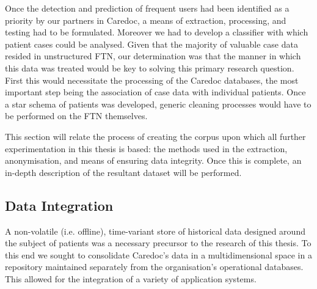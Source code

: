 %

Once the detection and prediction of frequent users had been identified as a priority by our partners in Caredoc, a means of extraction, processing, and testing had to be formulated. Moreover we had to develop a classifier with which patient cases could be analysed. Given that the majority of valuable case data resided in unstructured FTN, our determination was that the manner in which this data was treated would be key to solving this primary research question. First this would necessitate the processing of the Caredoc databases, the most important step being the association of case data with individual patients. Once a star schema of patients was developed, generic cleaning processes would have to be performed on the FTN themselves.


This section will relate the process of creating the corpus upon which all further experimentation in this thesis is based: the methods used in the extraction, anonymisation, and means of ensuring data integrity. Once this is complete, an in-depth description of the resultant dataset will be performed.


%




\subsection{Data Integration}

A non-volatile (i.e. offline), time-variant store of historical data designed around the subject of patients was a necessary precursor to the research of this thesis. To this end we sought to consolidate Caredoc's data in a multidimensional space in a repository maintained separately from the organisation’s operational databases. This allowed for the integration of a variety of application systems.  



